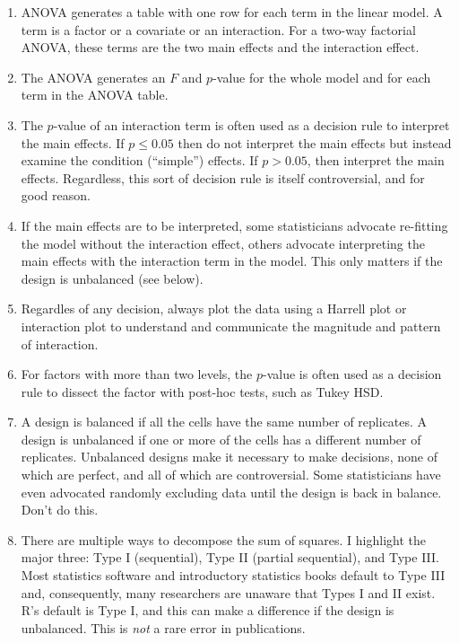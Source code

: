 \documentclass[]{book}
\providecommand{\tightlist}{%
  \setlength{\itemsep}{0pt}\setlength{\parskip}{0pt}}
\begin{document}
\begin{enumerate}
\def\labelenumi{\arabic{enumi}.}
\tightlist
\item
  ANOVA generates a table with one row for each term in the linear
  model. A term is a factor or a covariate or an interaction. For a
  two-way factorial ANOVA, these terms are the two main effects and the
  interaction effect.
\item
  The ANOVA generates an \(F\) and \(p\)-value for the whole model and
  for each term in the ANOVA table.
\item
  The \(p\)-value of an interaction term is often used as a decision
  rule to interpret the main effects. If \(p \le 0.05\) then do not
  interpret the main effects but instead examine the condition
  (``simple'') effects. If \(p > 0.05\), then interpret the main
  effects. Regardless, this sort of decision rule is itself
  controversial, and for good reason.
\item
  If the main effects are to be interpreted, some statisticians advocate
  re-fitting the model without the interaction effect, others advocate
  interpreting the main effects with the interaction term in the model.
  This only matters if the design is unbalanced (see below).
\item
  Regardles of any decision, always plot the data using a Harrell plot
  or interaction plot to understand and communicate the magnitude and
  pattern of interaction.
\item
  For factors with more than two levels, the \(p\)-value is often used
  as a decision rule to dissect the factor with post-hoc tests, such as
  Tukey HSD.
\item
  A design is balanced if all the cells have the same number of
  replicates. A design is unbalanced if one or more of the cells has a
  different number of replicates. Unbalanced designs make it necessary
  to make decisions, none of which are perfect, and all of which are
  controversial. Some statisticians have even advocated randomly
  excluding data until the design is back in balance. Don't do this.
\item
  There are multiple ways to decompose the sum of squares. I highlight
  the major three: Type I (sequential), Type II (partial sequential),
  and Type III. Most statistics software and introductory statistics
  books default to Type III and, consequently, many researchers are
  unaware that Types I and II exist. R's default is Type I, and this can
  make a difference if the design is unbalanced. This is \emph{not} a
  rare error in publications.

\end{enumerate}
\end{document}
